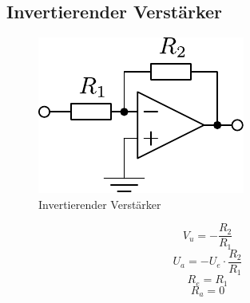 



\subsection{Invertierender Verstärker}
\begin{figure}[h!]
	\centering
	\includegraphics[scale=\schscale]{op_inv.pdf}
	\caption{Invertierender Verstärker}
	\label{sch:op-inv}
\end{figure}
\[ V_u = - \frac{R_2}{R_1} \]
\[ U_a = - U_e \cdot \frac{R_2}{R_1} \]
\[ R_e = R_1 \]
\[ R_a = 0 \]